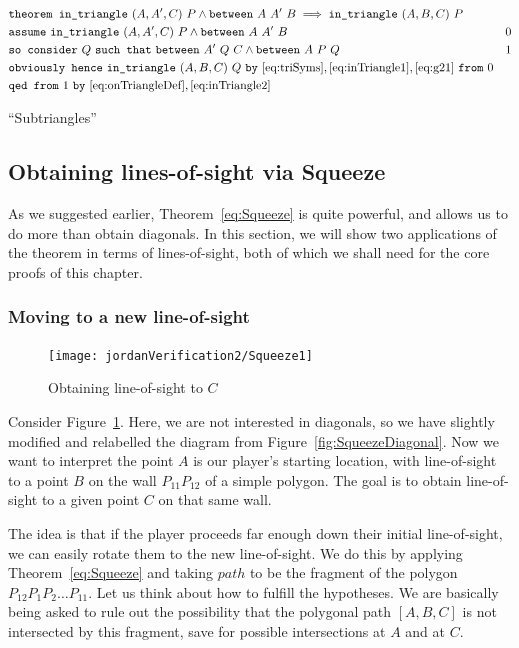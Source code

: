 \begin{boxedfigure}
\small
\begin{align*}
&\code{theorem }\code{in\_triangle}\ (A,A',C)\ P \wedge \between{A}{A'}{B} 
                  \implies \code{in\_triangle}\ (A,B,C)\ P\\
&\code{assume}\ \code{in\_triangle}\ (A,A',C)\ P \wedge \between{A}{A'}{B} & 0 \\
&\code{so consider}\ Q\ \code{such that}\ \between{A'}{Q}{C} \wedge \between{A}{P}{Q} & 1\\
&\code{obviously hence}\ \code{in\_triangle}\ (A,B,C)\ Q\ \code{by}\ \eqref{eq:triSyms},\eqref{eq:inTriangle1},\eqref{eq:g21}\ \code{from}\ 0\\
&\code{qed from}\ 1\ \code{by}\ \eqref{eq:onTriangleDef},\eqref{eq:inTriangle2}
\end{align*}
\caption{``Subtriangles''}
\label{fig:SubTriangle}
\end{boxedfigure}

\subsection{Obtaining lines-of-sight via Squeeze}\label{sec:SqueezeEye}
As we suggested earlier, Theorem~\ref{eq:Squeeze} is quite powerful, and allows us to do more than obtain diagonals. In this section, we will show two applications of the theorem in terms of lines-of-sight, both of which we shall need for the core proofs of this chapter. 

\subsubsection{Moving to a new line-of-sight}\label{sec:MoveToNew}
\begin{figure}
\centering\texttt{[image: jordanVerification2/Squeeze1]}
\caption{Obtaining line-of-sight to $C$}
\label{fig:Squeeze1}
\end{figure}

Consider Figure~\ref{fig:Squeeze1}. Here, we are not interested in diagonals, so we have slightly modified and relabelled the diagram from Figure~\ref{fig:SqueezeDiagonal}. Now we want to interpret the point $A$ is our player's starting location, with line-of-sight to a point $B$ on the wall $P_{11}P_{12}$ of a simple polygon. The goal is to obtain line-of-sight to a given point $C$ on that same wall.

The idea is that if the player proceeds far enough down their initial line-of-sight, we can easily rotate them to the new line-of-sight. We do this by applying Theorem~\ref{eq:Squeeze} and taking $path$ to be the fragment of the polygon $P_{12}P_1P_2\ldots P_{11}$. Let us think about how to fulfill the hypotheses. We are basically being asked to rule out the possibility that the polygonal path $[A,B,C]$ is not intersected by this fragment, save for possible intersections at $A$ and at $C$. 

